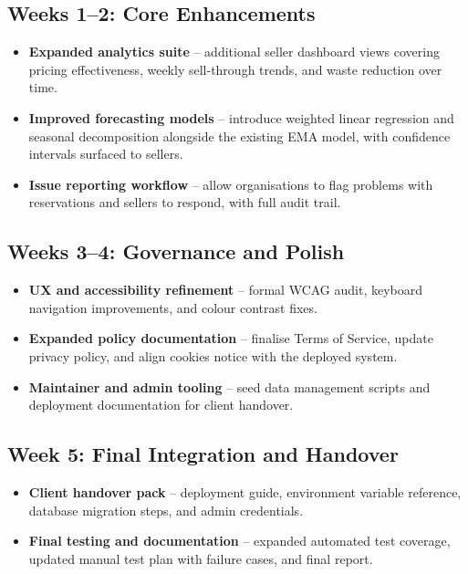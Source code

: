 \documentclass[11pt, a4paper]{report}
\begin{document}
\subsection{Weeks 1--2: Core Enhancements}
\begin{itemize}
\item \textbf{Expanded analytics suite} -- additional seller dashboard views covering pricing effectiveness, weekly sell-through trends, and waste reduction over time.
\item \textbf{Improved forecasting models} -- introduce weighted linear regression and seasonal decomposition alongside the existing EMA model, with confidence intervals surfaced to sellers.
\item \textbf{Issue reporting workflow} -- allow organisations to flag problems with reservations and sellers to respond, with full audit trail.
\end{itemize}

\subsection{Weeks 3--4: Governance and Polish}
\begin{itemize}
\item \textbf{UX and accessibility refinement} -- formal WCAG audit, keyboard navigation improvements, and colour contrast fixes.
\item \textbf{Expanded policy documentation} -- finalise Terms of Service, update privacy policy, and align cookies notice with the deployed system.
\item \textbf{Maintainer and admin tooling} -- seed data management scripts and deployment documentation for client handover.
\end{itemize}

\subsection{Week 5: Final Integration and Handover}
\begin{itemize}
\item \textbf{Client handover pack} -- deployment guide, environment variable reference, database migration steps, and admin credentials.
\item \textbf{Final testing and documentation} -- expanded automated test coverage, updated manual test plan with failure cases, and final report.
\end{itemize}



\end{document}

